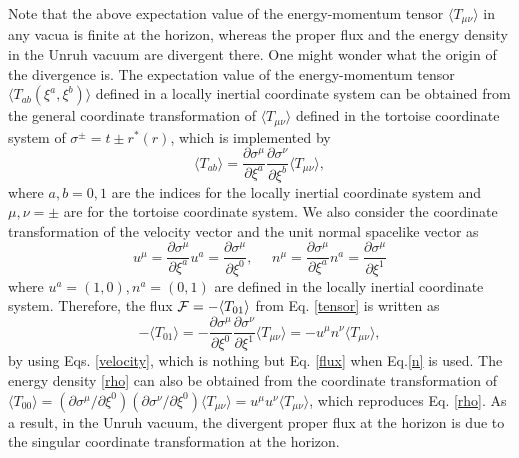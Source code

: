 \documentclass[aps,a4paper,showpacs,showkeys,superscriptaddress,12pt]{revtex4-1}
\begin{document}
Note that the above expectation value
of the energy-momentum tensor $\langle T_{\mu\nu} \rangle$  in any vacua is finite at the horizon,
whereas the proper flux and the energy density in the Unruh vacuum are divergent there.
One might wonder what the origin of the divergence is.
The expectation value of the energy-momentum tensor
$\langle T_{ab}(\xi^a,\xi^b) \rangle$ defined in a locally inertial coordinate system
can be obtained from the general coordinate transformation of
$ \langle T_{\mu\nu} \rangle$ defined in the tortoise coordinate system of $\sigma^{\pm}=t \pm r^{*}(r)$,
which is implemented by
\begin{equation}
\langle T_{ab} \rangle=\frac{\partial \sigma^\mu}{\partial \xi^a}
\frac{\partial \sigma^\nu}{\partial \xi^b} \langle T_{\mu\nu} \rangle,
\label{tensor}
\end{equation}
where $a,b=0,1$ are the indices for the locally inertial coordinate system and
$\mu,\nu=\pm$ are for the tortoise coordinate system.
We also consider the coordinate transformation of the velocity vector and the unit normal spacelike vector as
\begin{equation}
u^\mu = \frac{\partial \sigma^\mu}{ \partial \xi^a } u^a=\frac{\partial \sigma^\mu}{ \partial \xi^0 },~~~~~~
n^\mu = \frac{\partial \sigma^\mu}{ \partial \xi^a } n^a=\frac{\partial \sigma^\mu}{ \partial \xi^1 } \label{velocity}
\end{equation}
where $u^a=(1,0), n^a=(0,1)$ are defined in the locally inertial coordinate system.
Therefore, the flux ${\cal{F}}=-\langle T_{01} \rangle$  from Eq. \eqref{tensor} is written as
\begin{equation}
-\langle T_{01} \rangle=-\frac{\partial \sigma^\mu}{\partial \xi^0} \frac{\partial
\sigma^\nu}{\partial \xi^1} \langle T_{\mu\nu} \rangle=-u^\mu n^\nu
\langle T_{\mu\nu} \rangle, \label{t01}
\end{equation}
by using Eqs. \eqref{velocity}, which is nothing but Eq. \eqref{flux} when Eq.\eqref{n} is used.
The energy density \eqref{rho} can also be obtained from the coordinate transformation of
$\langle T_{00} \rangle=(\partial \sigma^\mu /\partial \xi^0) (\partial \sigma^\nu /\partial \xi^0)
\langle T_{\mu\nu} \rangle=u^\mu u^\nu
\langle T_{\mu\nu} \rangle$, which reproduces Eq. \eqref{rho}.
As a result, in the Unruh vacuum, the divergent proper flux
at the horizon is due to the singular coordinate transformation
at the horizon.

\end{document}

